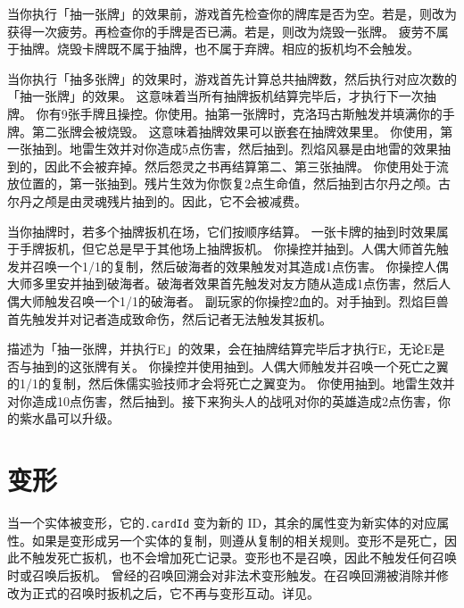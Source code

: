 当你执行「抽一张牌」的效果前，游戏首先检查你的牌库是否为空。若是，则改为获得一次疲劳。再检查你的手牌是否已满。若是，则改为烧毁一张牌。
\notice 疲劳不属于抽牌。烧毁卡牌既不属于抽牌，也不属于弃牌。相应的扳机均不会触发。

当你执行「抽多张牌」的效果时，游戏首先计算总共抽牌数，然后执行对应次数的「抽一张牌」的效果。
\notice 这意味着当所有抽牌扳机结算完毕后，才执行下一次抽牌。
\example 你有9张手牌且操控。你使用。抽第一张牌时，克洛玛古斯触发并填满你的手牌。第二张牌会被烧毁。
\notice 这意味着抽牌效果可以嵌套在抽牌效果里。
\example 你使用，第一张抽到。地雷生效并对你造成5点伤害，然后抽到。烈焰风暴是由地雷的效果抽到的，因此不会被弃掉。然后怨灵之书再结算第二、第三张抽牌。
\example 你使用处于流放位置的，第一张抽到。残片生效为你恢复2点生命值，然后抽到古尔丹之颅。古尔丹之颅是由灵魂残片抽到的。因此，它不会被减费。

当你抽牌时，若多个抽牌扳机在场，它们按顺序结算。
\notice 一张卡牌的抽到时效果属于手牌扳机，但它总是早于其他场上抽牌扳机。
\example {} 你操控并抽到。人偶大师首先触发并召唤一个1/1的复制，然后破海者的效果触发对其造成1点伤害。
\example {} 你操控人偶大师多里安并抽到破海者。破海者效果首先触发对友方随从造成1点伤害，然后人偶大师触发召唤一个1/1的破海者。
\example {}副玩家的你操控2血的。对手抽到。烈焰巨兽首先触发并对记者造成致命伤，然后记者无法触发其扳机。

描述为「抽一张牌，并执行E」的效果，会在抽牌结算完毕后才执行E，无论E是否与抽到的这张牌有关。
\example 你操控并使用抽到。人偶大师触发并召唤一个死亡之翼的1/1的复制，然后侏儒实验技师才会将死亡之翼变为。
\example 你使用抽到。地雷生效并对你造成10点伤害，然后抽到。接下来狗头人的战吼对你的英雄造成2点伤害，你的紫水晶可以升级。

\section{变形}

当一个实体被变形，它的\texttt{.cardId} 变为新的 ID，其余的属性变为新实体的对应属性。如果是变形成另一个实体的复制，则遵从复制的相关规则。变形不是死亡，因此不触发死亡扳机，也不会增加死亡记录。变形也不是召唤，因此不触发任何召唤时或召唤后扳机。
\notice {}曾经的召唤回溯会对非法术变形触发。在召唤回溯被消除并修改为正式的召唤时扳机之后，它不再与变形互动。详见。


